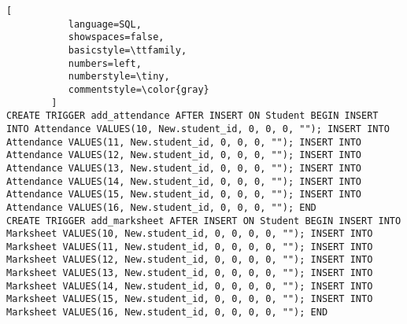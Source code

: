 \begin{lstlisting}[
           language=SQL,
           showspaces=false,
           basicstyle=\ttfamily,
           numbers=left,
           numberstyle=\tiny,
           commentstyle=\color{gray}
        ]
CREATE TRIGGER add_attendance AFTER INSERT ON Student BEGIN INSERT INTO Attendance VALUES(10, New.student_id, 0, 0, 0, ""); INSERT INTO Attendance VALUES(11, New.student_id, 0, 0, 0, ""); INSERT INTO Attendance VALUES(12, New.student_id, 0, 0, 0, ""); INSERT INTO Attendance VALUES(13, New.student_id, 0, 0, 0, ""); INSERT INTO Attendance VALUES(14, New.student_id, 0, 0, 0, ""); INSERT INTO Attendance VALUES(15, New.student_id, 0, 0, 0, ""); INSERT INTO Attendance VALUES(16, New.student_id, 0, 0, 0, ""); END
CREATE TRIGGER add_marksheet AFTER INSERT ON Student BEGIN INSERT INTO Marksheet VALUES(10, New.student_id, 0, 0, 0, 0, ""); INSERT INTO Marksheet VALUES(11, New.student_id, 0, 0, 0, 0, ""); INSERT INTO Marksheet VALUES(12, New.student_id, 0, 0, 0, 0, ""); INSERT INTO Marksheet VALUES(13, New.student_id, 0, 0, 0, 0, ""); INSERT INTO Marksheet VALUES(14, New.student_id, 0, 0, 0, 0, ""); INSERT INTO Marksheet VALUES(15, New.student_id, 0, 0, 0, 0, ""); INSERT INTO Marksheet VALUES(16, New.student_id, 0, 0, 0, 0, ""); END
\end{lstlisting}
\pagebreak


